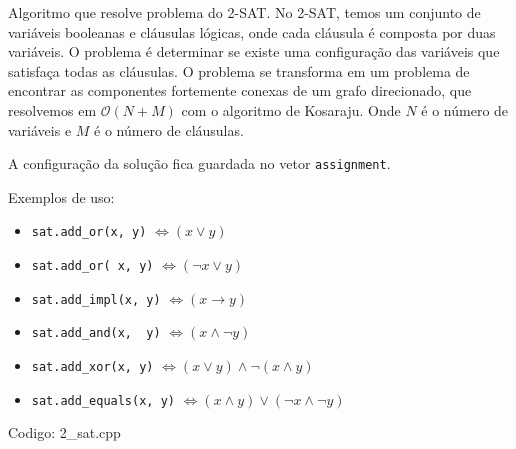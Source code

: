\documentclass[10pt, a4paper, oneside]{book}
\begin{document}
Algoritmo que resolve problema do 2-SAT. No 2-SAT, temos um conjunto de variáveis booleanas e cláusulas lógicas, onde cada cláusula é composta por duas variáveis. O problema é determinar se existe uma configuração das variáveis que satisfaça todas as cláusulas. O problema se transforma em um problema de encontrar as componentes fortemente conexas de um grafo direcionado, que resolvemos em $\mathcal{O}(N + M)$ com o algoritmo de Kosaraju. Onde $N$ é o número de variáveis e $M$ é o número de cláusulas.  



A configuração da solução fica guardada no vetor \texttt{assignment}.



Exemplos de uso:



\begin{itemize}
\item \texttt{sat.add\_or(x, y)} $\Leftrightarrow (x \lor y)$
\item \texttt{sat.add\_or(~x, y)} $\Leftrightarrow (\lnot x \lor y)$
\item \texttt{sat.add\_impl(x, y)} $\Leftrightarrow (x \rightarrow y)$
\item \texttt{sat.add\_and(x, ~y)} $\Leftrightarrow (x \land \lnot y)$
\item \texttt{sat.add\_xor(x, y)} $\Leftrightarrow (x \lor y) \land \lnot (x \land y)$
\item \texttt{sat.add\_equals(x, y)} $\Leftrightarrow (x \land y) \lor (\lnot x \land \lnot y)$
\end{itemize}

\hfill

Codigo: 2\_sat.cpp
\end{document}
